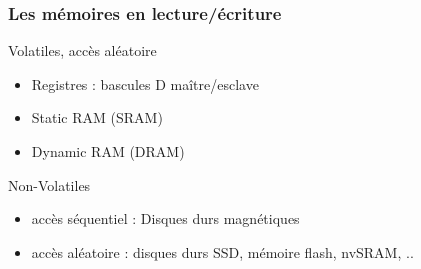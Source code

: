 \documentclass{beamer}
\begin{document}
\begin{frame}
\frametitle{Les mémoires en lecture/écriture}

\begin{block}{Volatiles, accès aléatoire}
\begin{itemize}
\item Registres : bascules D maître/esclave
\item Static RAM (SRAM)
\item Dynamic RAM (DRAM)
\end{itemize}
\end{block}

\begin{block}{Non-Volatiles}
\begin{itemize}
\item accès séquentiel : Disques durs magnétiques
\item accès aléatoire : disques durs SSD, mémoire flash, nvSRAM, ..
\end{itemize}
\end{block}

\end{frame}





\end{document}
